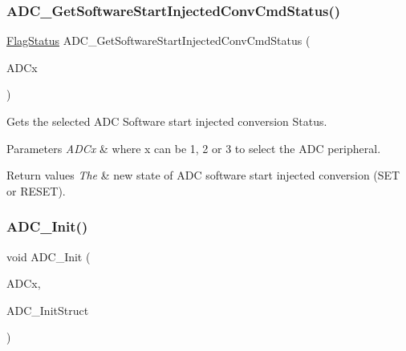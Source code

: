 \subsubsection{\texorpdfstring{ADC\_GetSoftwareStartInjectedConvCmdStatus()}{ADC\_GetSoftwareStartInjectedConvCmdStatus()}}
{\footnotesize\ttfamily \mbox{\hyperlink{group___exported__types_ga89136caac2e14c55151f527ac02daaff}{Flag\+Status}} A\+D\+C\+\_\+\+Get\+Software\+Start\+Injected\+Conv\+Cmd\+Status (\begin{DoxyParamCaption}\item[{\mbox{\hyperlink{struct_a_d_c___type_def}{A\+D\+C\+\_\+\+Type\+Def}} $\ast$}]{A\+D\+Cx }\end{DoxyParamCaption})}



Gets the selected A\+DC Software start injected conversion Status. 


\begin{DoxyParams}{Parameters}
{\em A\+D\+Cx} & where x can be 1, 2 or 3 to select the A\+DC peripheral. \\
\hline
\end{DoxyParams}

\begin{DoxyRetVals}{Return values}
{\em The} & new state of A\+DC software start injected conversion (S\+ET or R\+E\+S\+ET). \\
\hline
\end{DoxyRetVals}
\mbox{\label{group___a_d_c___exported___functions_gabbab6038cf8691404350625e477254f9}} 
\subsubsection{\texorpdfstring{ADC\_Init()}{ADC\_Init()}}
{\footnotesize\ttfamily void A\+D\+C\+\_\+\+Init (\begin{DoxyParamCaption}\item[{\mbox{\hyperlink{struct_a_d_c___type_def}{A\+D\+C\+\_\+\+Type\+Def}} $\ast$}]{A\+D\+Cx,  }\item[{\mbox{\hyperlink{struct_a_d_c___init_type_def}{A\+D\+C\+\_\+\+Init\+Type\+Def}} $\ast$}]{A\+D\+C\+\_\+\+Init\+Struct }\end{DoxyParamCaption})}



